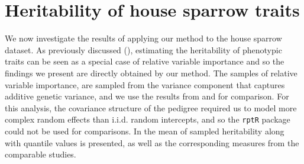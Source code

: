 \section{Heritability of house sparrow traits}
\label{sec:heritability_results}
We now investigate the results of applying our method to the house sparrow dataset. As previously discussed (), estimating the heritability of phenotypic traits can be seen as a special case of relative variable importance and so the findings we present are directly obtained by our method. The samples of relative variable importance, are sampled from the variance component that captures additive genetic variance, and we use the results from \citet{Silva2017} and \citet{Muff2019Genetic} for comparison. For this analysis, the covariance structure of the pedigree required us to model more complex random effects than i.i.d. random intercepts, and so the \texttt{rptR} package could not be used for comparisons. In  the mean of sampled heritability along with quantile values is presented, as well as the corresponding measures from the comparable studies.
